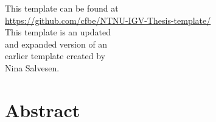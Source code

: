 \documentclass[a4paper, 12pt,oneside]{book} %
\newcommand\myemptypage{
    \null
    \thispagestyle{empty}
    \addtocounter{page}{-1}
    \newpage
    } %
\begin{document}
{%
  \sffamily
    \vbox{}\vfill
    {%
      \raggedleft
     This template can be found at \\
     \url{https://github.com/cfbe/NTNU-IGV-Thesis-template/} \\
      \vspace{2cm}
      This template is an updated \\ 
      and expanded version of an \\
      earlier template created by \\
      Nina Salvesen. \\
    }%
    \vbox{}
}%

\chapter*{Abstract} %
\setcounter{page}{1}



\tableofcontents
{}

\listoffigures
{}
\listoftables


\newpage
\myemptypage



\end{document}
